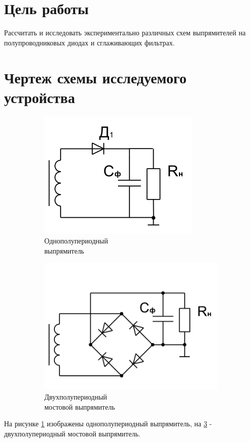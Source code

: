 





\section{Цель работы}

Рассчитать и исследовать экспериментально различных схем выпрямителей на полупроводниковых диодах и сглаживающих фильтрах.

\section{Чертеж схемы исследуемого устройства}
\begin{figure}[h]
	\centering
	\vspace{-0.5cm}
	\begin{subfigure}[b]{0.35\textwidth}
		\includegraphics[scale=0.75]{img/diod.png}
		\caption{Однополупериодный \\выпрямитель}\label{figure:2.1:a}
	\end{subfigure}
	\begin{subfigure}[b]{0.35\textwidth}
		\includegraphics[scale=0.40]{img/4diods.png}
		\caption{Двухполупериодный \\мостовой выпрямитель}\label{figure:2.1:b}
	\end{subfigure}
	\caption{}
\end{figure}
На рисунке \ref{figure:2.1:a} изображены однополупериодный выпрямитель, на \ref{figure:2.1:b} - двухполупериодный мостовой выпрямитель.


